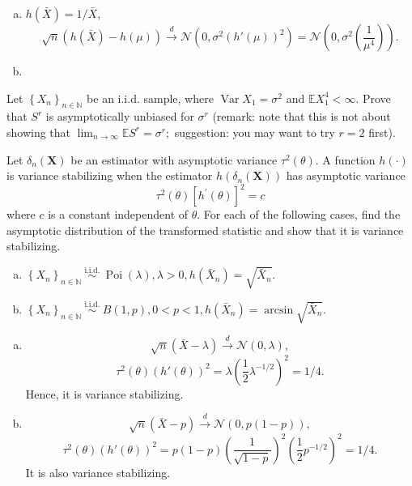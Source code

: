 \begin{solution}
    \begin{enumerate}[(a)]
        \item $h(\bar{X})=1/\bar{X}$, \[
            \sqrt{n}(h(\bar{X}) - h(\mu)) \stackrel{d}{\rightarrow} \mathcal{N}(0,\sigma^2(h'(\mu))^2)=\mathcal{N}\left(0,\sigma^2\left(\frac{1}{\mu^4}\right)\right).
        \]
        \item 
    \end{enumerate}
\end{solution}

\begin{ex}
    Let \(\left\{X_{n}\right\}_{n \in \mathbb{N}}\) be an i.i.d. sample, where \(\operatorname{Var} X_{1}=\sigma^{2}\) and \(\mathbb{E} X_{1}^{4}<\infty\). Prove that \(S^{r}\) is asymptotically unbiased for \(\sigma^{r}\) (remark: note that this is not about showing that \(\lim _{n \rightarrow \infty} \mathbb{E} S^{r}=\sigma^{r} ;\) suggestion: you may want to try \(r=2\) first). 
\end{ex}


\begin{ex}
    Let \(\delta_{n}(\mathbf{X})\) be an estimator with asymptotic variance \(\tau^{2}(\theta)\). A function \(h(\cdot)\) is variance stabilizing when the estimator \(h\left(\delta_{n}(\mathbf{X})\right)\) has asymptotic variance
    \begin{equation}
        \label{eq:6.12}
        \tau^{2}(\theta)\left[h^{\prime}(\theta)\right]^{2}=c
    \end{equation}
    where \(c\) is a constant independent of \(\theta\). For each of the following cases, find the asymptotic distribution of the transformed statistic and show that it is variance stabilizing. 
    \begin{enumerate}[(a)]
        \item \(\left\{X_{n}\right\}_{n \in \mathbb{N}} \stackrel{\text { i.i.d. }}{\sim} \operatorname{Poi}(\lambda), \lambda>0, h\left(\bar{X}_{n}\right)=\sqrt{\bar{X}_{n}}\). 
        \item \(\left\{X_{n}\right\}_{n \in \mathbb{N}} \stackrel{\text { i.i.d. }}{\sim} B(1, p), 0<p<1, h\left(\bar{X}_{n}\right)=\arcsin \sqrt{\bar{X}_{n}}\). 
    \end{enumerate}
\end{ex}

\begin{solution}
    \begin{enumerate}[(a)]
        \item \[
            \sqrt{n}(\bar{X}-\lambda)\stackrel{d}{\to} \mathcal{N}(0, \lambda), 
        \]
        \[
            \tau^2(\theta)(h'(\theta))^2=\lambda\left(\frac{1}{2}\lambda^{-1/2}\right)^2=1/4. 
        \]
        Hence, it is variance stabilizing. 
        \item \[
            \sqrt{n}(\bar{X}-p)\stackrel{d}{\to} \mathcal{N}(0, p(1-p)),
        \]
        \[
            \tau^2(\theta)(h'(\theta))^2=p(1-p)\left(\frac{1}{\sqrt{1-p}}\right)^2\left(\frac{1}{2}p^{-1/2}\right)^2=1/4. 
        \]
        It is also variance stabilizing. 
    \end{enumerate}
\end{solution}


